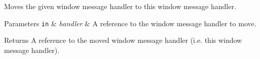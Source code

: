 Moves the given window message handler to this window message handler.


\begin{DoxyParams}[1]{Parameters}
\mbox{\tt in}  & {\em handler} & A reference to the window message handler to move. \\
\hline
\end{DoxyParams}
\begin{DoxyReturn}{Returns}
A reference to the moved window message handler (i.\+e. this window message handler). 
\end{DoxyReturn}
